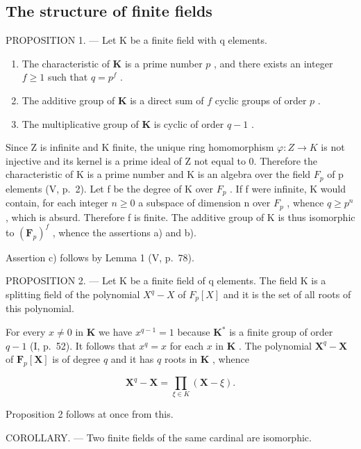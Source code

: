 \subsection{The structure of finite fields}

PROPOSITION 1. --- Let K be a finite field with q elements.

\begin{enumerate}
\def\labelenumi{\alph{enumi})}
\item
  The characteristic of \(\mathbf{K}\) is a prime number \(p\) , and there exists an integer \(f \geqslant 1\) such that \(q = p^f\) .
\item
  The additive group of \(\mathbf{K}\) is a direct sum of \(f\) cyclic groups of order \(p\) .
\item
  The multiplicative group of \(\mathbf{K}\) is cyclic of order \(q - 1\) .
\end{enumerate}

Since Z is infinite and K finite, the unique ring homomorphism \(\varphi:Z\to K\) is not injective and its kernel is a prime ideal of Z not equal to 0. Therefore the characteristic of K is a prime number and K is an algebra over the field \(F_{p}\) of p elements (V, p.~2). Let f be the degree of K over \(F_{p}\) . If f were infinite, K would contain, for each integer \(n\geqslant0\) a subspace of dimension n over \(F_{p}\) , whence \(q\geqslant p^{n}\) , which is absurd. Therefore f is finite. The additive group of K is thus isomorphic to \((\mathbf{F}_{p})^{f}\) , whence the assertions a) and b).

Assertion c) follows by Lemma 1 (V, p.~78).

PROPOSITION 2. --- Let K be a finite field of q elements. The field K is a splitting field of the polynomial \(X^{q}-X\) of \(F_{p}[X]\) and it is the set of all roots of this polynomial.

For every \(x \neq 0\) in \(\mathbf{K}\) we have \(x^{q-1} = 1\) because \(\mathbf{K}^*\) is a finite group of order \(q - 1\) (I, p.~52). It follows that \(x^q = x\) for each \(x\) in \(\mathbf{K}\) . The polynomial \(\mathbf{X}^q - \mathbf{X}\) of \(\mathbf{F}_p[\mathbf{X}]\) is of degree \(q\) and it has \(q\) roots in \(\mathbf{K}\) , whence

\[
\mathbf {X} ^ {q} - \mathbf {X} = \prod_ {\xi \in K} (\mathbf {X} - \xi).\tag{1}
\]

Proposition 2 follows at once from this.

COROLLARY. --- Two finite fields of the same cardinal are isomorphic.

